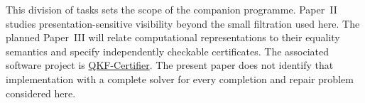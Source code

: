 This division of tasks sets the scope of the companion programme.
Paper~II~\cite{ShcherbakovII} studies presentation-sensitive visibility
beyond the small filtration used here. The planned Paper~III will relate
computational representations to their equality semantics and specify
independently checkable certificates. The associated software project is
\href{https://github.com/Len989/QKF-Certifier}{QKF-Certifier}.
The present paper does not identify that implementation with a complete
solver for every completion and repair problem considered here.
